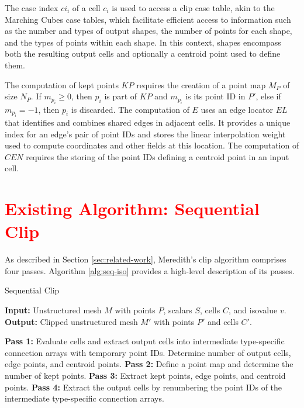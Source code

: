 \documentclass{egpubl}
\newcommand*{\fix}[1]{\textcolor{red}{#1}}
\begin{document}
The case index $ci_i$ of a cell $c_i$ is used to access a clip case table, akin to the Marching Cubes case tables, which facilitate efficient access to information such as the number and types of output shapes, the number of points for each shape, and the types of points within each shape. In this context, shapes encompass both the resulting output cells and optionally a centroid point used to define them.

The computation of kept points $KP$ requires the creation of a point map $M_P$ of size $N_P$. If $m_{p_i} \geq 0$, then $p_i$ is part of $KP$ and $m_{p_i}$ is its point ID in $P'$, else if $m_{p_i} = -1$, then $p_i$ is discarded.  The computation of $E$ uses an edge locator $EL$ that identifies and combines shared edges in adjacent cells. It provides a unique index for an edge's pair of point IDs and stores the linear interpolation weight used to compute coordinates and other fields at this location. The computation of $CEN$ requires the storing of the point IDs defining a centroid point in an input cell.

\section{\fix{Existing Algorithm: Sequential Clip}}
\label{sec:sequential-clip-algorithm}

As described in Section \ref{sec:related-work}, Meredith's clip algorithm comprises four passes. Algorithm \ref{alg:seq-iso} provides a high-level description of its passes.

\begin{algorithm}
\caption{Sequential Clip}
\label{alg:seq-iso}
\raggedright
\textbf{Input:} Unstructured mesh $M$ with points $P$, scalars $S$, cells $C$, and isovalue $v$.\\
\textbf{Output:} Clipped unstructured mesh $M'$ with points $P'$ and cells $C'$.
\begin{algorithmic}[1]
    \State \textbf{Pass 1:} Evaluate cells and extract output cells into intermediate type-specific connection arrays with temporary point IDs. Determine number of output cells, edge points, and centroid points.
    \State \textbf{Pass 2:} Define a point map and determine the number of kept points.
    \State \textbf{Pass 3:} Extract kept points, edge points, and centroid points.
    \State \textbf{Pass 4:} Extract the output cells by renumbering the point IDs of the intermediate type-specific connection arrays.
\end{algorithmic}
\end{algorithm}
\end{document}
